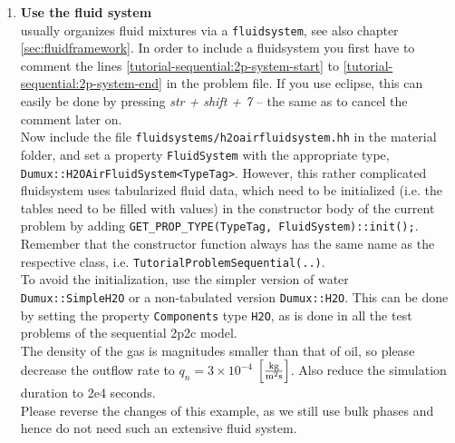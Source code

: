\begin{enumerate}
\item \textbf{Use the \Dumux fluid system}\label{dec-ex1-fluidsystem} \\
\Dumux usually organizes fluid mixtures via a \texttt{fluidsystem}, see also chapter
\ref{sec:fluidframework}. In order to include a fluidsystem you first have to comment
the lines \ref{tutorial-sequential:2p-system-start} to \ref{tutorial-sequential:2p-system-end}
in the problem file. If you use eclipse, this can easily be done by pressing
\textit{str + shift + 7} -- the same as to cancel the comment later on.\\
Now include the file \texttt{fluidsystems/h2oairfluidsystem.hh} in the material folder,
and set a property \texttt{FluidSystem} with the appropriate type,
\texttt{Dumux::H2OAirFluidSystem<TypeTag>}. However, this rather complicated fluidsystem
uses tabularized fluid data, which need to be initialized (i.e. the tables need to be
filled with values) in the constructor body of the current problem by adding
\texttt{GET\_PROP\_TYPE(TypeTag, FluidSystem)::init();}. Remember that the constructor
function always has the same name as the respective class, i.e. \texttt{TutorialProblemSequential(..)}.\\
To avoid the initialization, use the simpler version of water \texttt{Dumux::SimpleH2O}
or a non-tabulated version \texttt{Dumux::H2O}. This can be done by setting the property
\texttt{Components} type \texttt{H2O},
as is done in all the test problems of the sequential 2p2c model.\\
The density of the gas is magnitudes smaller than that of oil, so please decrease
the outflow rate to $q_n = 3 \times 10^{-4}$ $\left[\frac{\textnormal{kg}}{\textnormal{m}^2 \textnormal{s}}\right]$.
Also reduce the simulation duration to 2e4 seconds.\\
Please reverse the changes of this example, as we still use bulk phases and
hence do not need such an extensive fluid system.


\end{enumerate}
